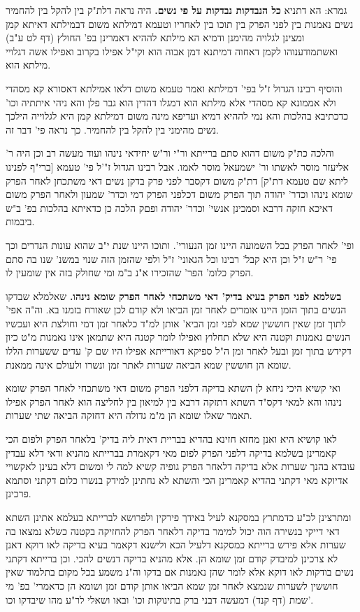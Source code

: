 \documentclass[12pt, openany]{book}
\newcommand{\sethebfont}{
\fontsize{10.5pt}{21.0pt} \selectfont
}
\newcommand{\twocol}[1]{
	{\sethebfont \begin{multicols}{2}
			#1
	\end{multicols}}	
}
\begin{document}
\twocol{גמרא: הא דתניא \textbf{כל הנבדקות נבדקות על פי נשים.}  היה נראה דלת"ק בין להקל בין להחמיר נשים נאמנות בין לפני הפרק בין תוכו בין לאחריו וטעמא דמילתא משום דבמילתא דאיתא קמן ומצינן לגלויה מהימנן ודמיא הא מילתא לההיא דאמרינן בפ' החולץ (דף לט ע"ב) ואשתמודענוהו לקמן דאחוה דמיתנא דמן אבוה הוא וקי"ל אפילו בקרוב ואפילו אשה דגלויי מילתא הוא.\par והוסיף רבינו הגדול ז"ל בפי' דמילתא ואמר טעמא משום דלאו אמילתא דאסורא קא מסהדי ולא אממונא קא מסהדי אלא מילתא הוא דמגלו דהדין הוא גבר פלן והא ניהי איתתיה וכו' כדכתיבא בהלכות והא נמי לההיא דמיא ועדיפא מינה משום דמילתא קמן היא לגלוייה הילכך נשים מהימני בין להקל בין להחמיר. כך נראה פי' דבר זה.\par  והלכה כת"ק משום דהוא סתם ברייתא ור"י ור"ש יחידאי נינהו ועוד מעשה רב וכן היה ר' אליעזר מוסר לאשתו ור' ישמעאל מוסר לאמו. אבל רבינו הגדול ז"'ל פי' טעמא {\small [ברי"ף לפנינו ליתא שם טעמא דת"ק]}  דת"ק משום דקסבר לפני פרק בדקן נשים דאי משתכחן לאחר הפרק שומא נינהו וכדר' יהודה תוך הפרק משום דכלפני הפרק דמי וכדר' שמעון ולאחר הפרק משום דאיכא חזקה דרבא וסמכינן אנשי' וכדר' יהודה ופםק הלכה כן כדאיתא בהלכות בפ' ב"ש ביבמות.\par  ופי' לאחר הפרק בכל השמועה היינו זמן הנעורי'. ותוכו היינו שנת י"ב שהוא עונות הנדרים וכך פי' ר"ש ז"ל וכן היא קבל' רבינו וכל הגאוני' ז"ל ולפי שהזמן הזה שנוי במשנ' שנו בה סתם הפרק כלומ' הפר' שהזכירו א"נ ב"מ ומי שחולק בזה אין שומעין לו. 
\par\textbf{בשלמא לפני הפרק בעיא בדיק' דאי משתכחי לאחר הפרק שומא נינהו.}  שאלמלא שבדקו הנשים בתוך הזמן היינו אומרים לאחר זמן הביאו ולא קודם לכן שאורח בזמנו בא. וה"ה אפי' לתוך זמן שאין חוששין שמא לפני זמן הביא' אותן למ"ד כלאחר זמן דמי וחולצת היא ועכשיו הנשים נאמנות וקטנה היא שלא תחלוץ ואפילו לומר קטנה היא שתמאן אינו נאמנות מ"ט כיון דקידש בתוך זמן ובעל לאחר זמן ה"ל ספיקא דאורייתא אפילו היו שם ק' עדים ששערות הללו שומא הן חוששין שמא הביאה שערות לאתר זמן ונשרו ולעולם אינה ממאנת.\par ואי קשיא היכי ניחא לן השתא בדיקה דלפני הפרק משום דאי משתכחי לאחר הפרק שומא נינהו והא למאי דקס"ד השתא דתזקה דרבא בין למיאון בין לחליצה הוא לאחר הפרק אפילו תאמר שאלו שומא הן מ"מ גדולה היא דחזקה הביאה שתי שערות.\par  לאו קושיא היא ואנן מחזא חזינא בהדיא בבריית דאית ליה בדיק' בלאחר הפרק ולפום הכי קאמרינן בשלמא בדיקה דלפני הפרק לפום מאי דקאמרת בברייתא מהניא ודאי דלא עבדין עובדא בהנך שערות אלא בדיקה דלאחר הפרק גופיה קשיא למה לי ומשום דלא בעינן לאקשויי אדיוקא מאי דקתני בהדיא קאמרינן הכי והשתא לא נחתינן למידק בנשרו כלום דקתני וסתמא פרכינן.\par  ומתרצינן לכ"ע כדמתרץ במסקנא לעיל באידך פירקין ולפרושא לברייתא בעלמא אתינן השתא דאי דייקי בנשירה הוה יכול למימר בדיקה דלאחר הפרק להחזיקה בקטנה כשלא נמצאו בה שערות אלא פירש ברייתא כמסקנא דלעיל הכא ולישנא דקאמר בעיא בדיקה לאו דוקא דאנן לא צרכינן למיבדק קודם זמן שומא הן. אלא מהניא בדיקה דנשים להכי. וכן ברייתא דקתני נשים בודקות לאו דוקא אלא לומר שהן נאמנות אם בדקו וה"נ משמע בכל מקום בתלמוד שאין חוששין לשערות שנמצא לאחר זמן שמא הביאו אותן קודם זמן ושומא הן כדאמרי' בפ' מי שמת (דף קנד) דמעשה דבני ברק בתינוקות וכו' ובאו ושאלי לר"ע מהו שיבדקו וכו'. 
}
\end{document}
